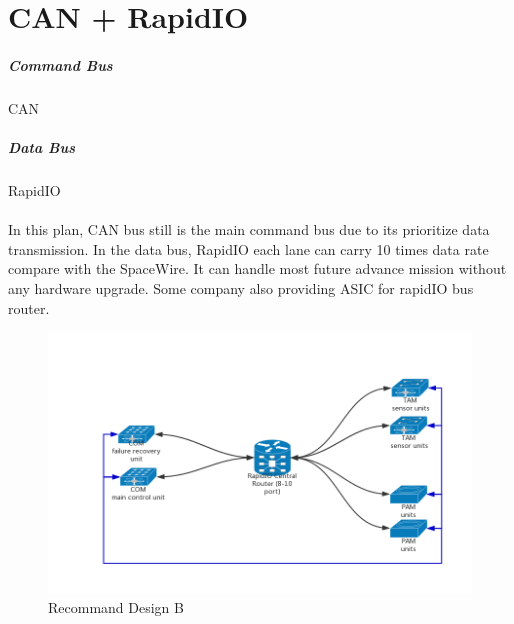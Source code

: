 \documentclass[12pt,article]{memoir}
\begin{document}
\section{CAN + RapidIO}
\subparagraph{Command Bus}CAN
\subparagraph{Data Bus}RapidIO\\\\
In this plan, CAN bus still is the main command bus due to its prioritize data transmission. In the data bus, RapidIO each lane can carry 10 times data rate compare with the SpaceWire. It can handle most future advance mission without any hardware upgrade. Some company also providing ASIC for rapidIO bus router.
\begin{figure}[htp]
\includegraphics[width=\textwidth]{img/DR00001_RapidIO.png}
 \caption{Recommand Design B}	
\end{figure}
\newpage
\end{document}
